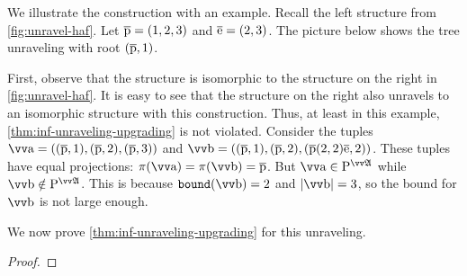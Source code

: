 We illustrate the construction with an example.
Recall the left structure from \cref{fig:unravel-haf}.
Let $\overline{\mathrm{p}} = (1,2,3)$ and $\overline{\mathrm{e}} = (2,3)$.
The picture below shows the tree unraveling with root $(\overline{\mathrm{p}}, 1)$.
\begin{figure}[H]
  \centering
\end{figure}
First, observe that the structure is isomorphic to the structure on the right in \cref{fig:unravel-haf}.
It is easy to see that the structure on the right also unravels to an isomorphic structure with this construction.
Thus, at least in this example, \cref{thm:inf-unraveling-upgrading} is not violated.
Consider the tuples $\elemtuptuplea = ((\elemtuplep, 1), (\elemtuplep, 2), (\elemtuplep, 3))$ and $\elemtuptupleb = ((\elemtuplep, 1), (\elemtuplep, 2), (\elemtuplep(2,2)\elemtuplee, 2))$.
These tuples have equal projections: $\pi(\elemtuptuplea) = \pi(\elemtuptupleb) = \elemtuplep$.
But $\elemtuptuplea \in \relP^{\unravel{A}}$ while $\elemtuptupleb \notin \relP^{\unravel{A}}$.
This is because $\mathtt{bound}(\elemtuptupleb) = 2$ and $|\elemtuptupleb| = 3$, so the bound for $\elemtuptupleb$ is not large enough.

We now prove \cref{thm:inf-unraveling-upgrading} for this unraveling.
\begin{proof}
\end{proof}
